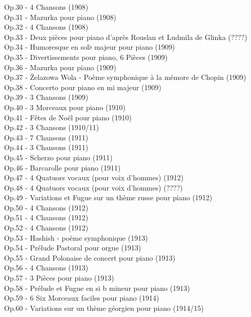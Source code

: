 Op.30 - 4 Chansons (1908)\\
Op.31 - Mazurka  pour piano (1908)\\
Op.32 - 4 Chansons (1908)\\
Op.33 - Deux pièces pour piano d'après Rouslan et Ludmila de Glinka ($????$)\\
Op.34 - Humoresque en sol$\flat$ majeur pour piano (1909)\\
Op.35 - Divertissements pour piano, 6 Pièces (1909)\\
Op.36 - Mazurka  pour piano (1909)\\
Op.37 - Żelazowa Wola - Poème symphonique à la mémore de Chopin (1909)\\
Op.38 - Concerto pour piano  en mi majeur (1909)\\
Op.39 - 3 Chansons (1909)\\
Op.40 - 3 Morceaux pour piano (1910)\\
Op.41 - Fêtes de Noël pour piano (1910)\\
Op.42 - 3 Chansons (1910/11)\\
Op.43 - 7 Chansons (1911)\\
Op.44 - 3 Chansons (1911)\\
Op.45 - Scherzo pour piano (1911)\\
Op.46 - Barcarolle pour piano (1911)\\
Op.47 - 4 Quatuors vocaux (pour voix d'hommes) (1912)\\
Op.48 - 4 Quatuors vocaux (pour voix d'hommes) ($????$)\\
Op.49 - Variations et Fugue sur un thème russe pour piano (1912)\\
Op.50 - 4 Chansons (1912)\\
Op.51 - 4 Chansons (1912)\\
Op.52 - 4 Chansons (1912)\\
Op.53 - Hashish - poème symphonique (1913)\\
Op.54 - Prélude Pastoral pour orgue (1913)\\
Op.55 - Grand Polonaise de concert pour piano (1913)\\
Op.56 - 4 Chansons (1913)\\
Op.57 - 3 Pièces pour piano (1913)\\
Op.58 - Prélude et Fugue en si b mineur pour piano (1913)\\
Op.59 - 6 Six Morceaux faciles pour piano (1914)\\
Op.60 - Variations sur un thème géorgien pour piano (1914/15)\\
